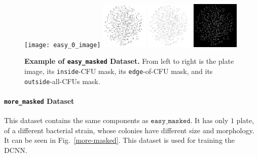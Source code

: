 \documentclass[10pt,letterpaper]{article}
\begin{document}
            \begin{figure}[h]
                \graphicspath{{results/preprocess_masked/figures/original/}}
                \texttt{[image: easy\_0\_image]}
                \includegraphics[width=0.2\textwidth]{easy_0_inside}
                \includegraphics[width=0.2\textwidth]{easy_0_edge}
                \includegraphics[width=0.2\textwidth]{easy_0_outside}
                \caption{{\bf Example of \texttt{easy\_masked} Dataset.} From left to right is the plate image, its \texttt{inside}-CFU mask, its \texttt{edge}-of-CFU mask, and its \texttt{outside}-all-CFUs mask.}
                \label{easy-masked}
            \end{figure}

        \paragraph*{\texttt{more\_masked} Dataset}
            This dataset contains the same components as $\texttt{easy\_masked}$. It has only $1$ plate, of a different bacterial strain, whose colonies have different size and morphology. It can be seen in Fig.~\ref{more-masked}. This dataset is used for training the DCNN.
        
\end{document}
